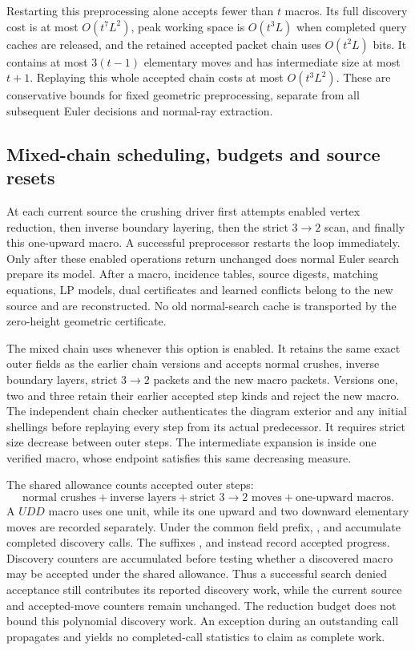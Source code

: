 Restarting this preprocessing alone accepts fewer than $t$ macros.
Its full discovery cost is at most $O(t^7L^2)$, peak working space is
$O(t^3L)$ when completed query caches are released, and the retained
accepted packet chain uses $O(t^2L)$ bits.  It contains at most
$3(t-1)$ elementary moves and has intermediate size at most $t+1$.
Replaying this whole accepted chain costs at most $O(t^3L^2)$.
These are conservative bounds for fixed geometric preprocessing,
separate from all subsequent Euler decisions and normal-ray extraction.

\subsection{Mixed-chain scheduling, budgets and source resets}

At each current source the crushing driver first attempts enabled
vertex reduction, then inverse boundary layering, then the strict
$3\to2$ scan, and finally this one-upward macro.  A successful
preprocessor restarts the loop immediately.  Only after these enabled
operations return unchanged does normal Euler search prepare its model.
After a macro, incidence tables, source digests, matching equations,
LP models, dual certificates and learned conflicts belong to the new
source and are reconstructed.  No old normal-search cache is transported
by the zero-height geometric certificate.

The mixed chain uses  whenever this option
is enabled.  It retains the same exact outer fields as the earlier
chain versions and accepts normal crushes, inverse boundary layers,
strict $3\to2$ packets and the new macro packets.  Versions one, two
and three retain their earlier accepted step kinds and reject the new
macro.  The independent chain checker authenticates the diagram
exterior and any initial shellings before replaying every step from
its actual predecessor.  It requires strict size decrease between
outer steps.  The intermediate expansion is inside one verified macro,
whose endpoint satisfies this same decreasing measure.

The shared  allowance counts accepted outer steps:
\[
 \text{normal crushes}+\text{inverse layers}
 +\text{strict }3\to2\text{ moves}+\text{one-upward macros}.
\]
A $UDD$ macro uses one unit, while its one upward and two downward
elementary moves are recorded separately.  Under the common
 field prefix, ,  and
 accumulate completed discovery calls.  The suffixes
,  and  instead
record accepted progress.
Discovery counters are accumulated before testing whether a discovered
macro may be accepted under the shared allowance.  Thus a successful
search denied acceptance still contributes its reported discovery work,
while the current source and accepted-move counters remain unchanged.
The reduction budget does not bound this polynomial discovery work.
An exception during an outstanding call propagates and yields no
completed-call statistics to claim as complete work.

